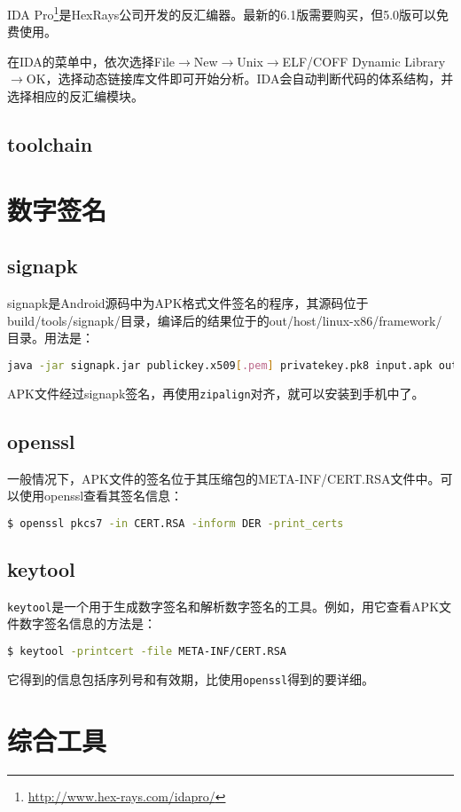 IDA Pro\footnote{\url{http://www.hex-rays.com/idapro/}}是Hex\-Rays公司开发的反汇编器。最新的6.1版需要购买，但5.0版可以免费使用。

在IDA的菜单中，依次选择File$\rightarrow$New$\rightarrow$Unix$\rightarrow$ELF/COFF Dynamic Library$\rightarrow$OK，选择动态链接库文件即可开始分析。IDA会自动判断代码的体系结构，并选择相应的反汇编模块。
\subsection{toolchain}

\section{数字签名}
\subsection{signapk}
signapk是Android源码中为APK格式文件签名的程序，其源码位于build/tools/signapk/目录，编译后的结果位于的out/host/linux-x86/framework/目录。用法是：
\begin{lstlisting}[language=bash, numbers=none]
java -jar signapk.jar publickey.x509[.pem] privatekey.pk8 input.apk output.apk
\end{lstlisting}
APK文件经过signapk签名，再使用\lstinline!zipalign!对齐，就可以安装到手机中了。

\subsection{openssl}
一般情况下，APK文件的签名位于其压缩包的META-INF/CERT.RSA文件中。可以使用openssl查看其签名信息：
\begin{lstlisting}[language=bash, numbers=none]
 $ openssl pkcs7 -in CERT.RSA -inform DER -print_certs
\end{lstlisting}

\subsection{keytool}
\lstinline!keytool!是一个用于生成数字签名和解析数字签名的工具。例如，用它查看APK文件数字签名信息的方法是：
\begin{lstlisting}[language=bash, numbers=none]
 $ keytool -printcert -file META-INF/CERT.RSA
\end{lstlisting}
它得到的信息包括序列号和有效期，比使用\lstinline!openssl!得到的要详细。

\section{综合工具}
